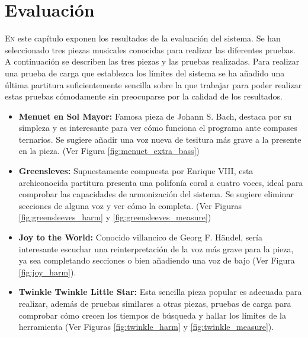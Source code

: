 \chapter{Evaluación}
\label{chap:evaluation}
\vspace{0.5cm}


 \lettrine{E}{n} este capítulo exponen los resultados de la evaluación del sistema. Se han seleccionado tres piezas musicales conocidas para realizar las diferentes pruebas. A continuación se describen las tres piezas y las pruebas realizadas. Para realizar una prueba de carga que establezca los límites del sistema se ha añadido una última partitura suficientemente sencilla sobre la que trabajar para poder realizar estas pruebas cómodamente sin preocuparse por la calidad de los resultados.
 
 \begin{itemize}
 	\item \textbf{Menuet en Sol Mayor:} Famosa pieza de Johann S. Bach, destaca por su simpleza y es interesante para ver cómo funciona el programa ante compases ternarios. Se sugiere añadir una voz nueva de tesitura más grave a la presente en la pieza. (Ver Figura \ref{fig:menuet_extra_bass})
 	\item \textbf{Greensleves:} Supuestamente compuesta por Enrique VIII, esta archiconocida partitura presenta una polifonía coral a cuatro voces, ideal para comprobar las capacidades de armonización del sistema. Se sugiere eliminar secciones de alguna voz y ver cómo la completa. (Ver Figuras \ref{fig:greensleeves_harm} y \ref{fig:greensleeves_measure})
 	\item \textbf{Joy to the World:} Conocido villancico de Georg F. Händel, sería interesante escuchar una reinterpretación de la voz más grave para la pieza, ya sea completando secciones o bien añadiendo una voz de bajo (Ver Figura \ref{fig:joy_harm}).
    \item \textbf{Twinkle Twinkle Little Star:} Esta sencilla pieza popular es adecuada para realizar, además de pruebas similares a otras piezas, pruebas de carga para comprobar cómo crecen los tiempos de búsqueda y hallar los límites de la herramienta (Ver Figuras \ref{fig:twinkle_harm} y \ref{fig:twinkle_measure}).
 \end{itemize}
 
